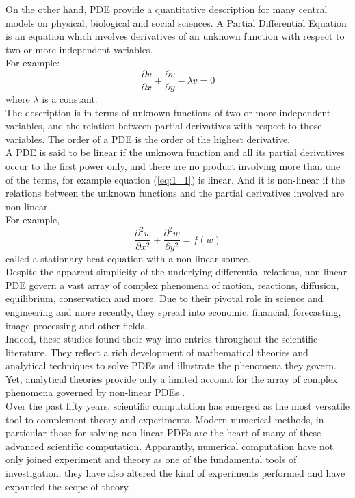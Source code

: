 \documentclass[11pt]{report}
\newcommand{\NI}{\noindent}
\newcommand{\sps}{\\[0.2cm]}
\newcommand{\refn}[1]{(\ref{#1})}
\newcommand{\refx}[1]{\refn{eq:#1}}
\newcommand{\PDe}{Partial Differential Equation }
\newcommand{\PDE}{PDE }
\newcommand{\PDEs}{PDEs }
\begin{document}
	\NI On the other hand, PDE provide a quantitative description for many central models on physical, biological and social sciences. A \PDe is an equation which involves derivatives of an unknown function with respect to two or more independent variables.\sps
	For example:
	\begin{equation}
		\frac{\partial v}{\partial x} + \frac{\partial v}{\partial y} - \lambda v = 0
		\label{eq:1_1}
	\end{equation}
	where $\lambda$ is a constant.\sps
	
	The description is in terms of unknown functions of two or more independent variables, and the relation between partial derivatives with respect to those variables. The order of a \PDE is the order of the highest derivative.\\
	
	A \PDE is said to be linear if the unknown function and all its partial derivatives occur to the first power only, and there are no product involving more than one of the terms, for example equation \refx{1_1} is linear. And it is non-linear if the relations between the unknown functions and the partial derivatives involved are non-linear.\sps
	For example,
	\begin{equation}
		\frac{\partial^2w}{\partial x^2}+\frac{\partial^2w}{\partial y^2} = f(w)
		\label{eq:1_2}
	\end{equation}
	called a stationary heat equation with a non-linear source.\sps
	
	Despite the apparent simplicity of the underlying differential relations, non-linear \PDE govern a vast array of complex phenomena of motion, reactions, diffusion, equilibrium, conservation and more. Due to their pivotal role in science and engineering and more recently, they spread into economic, financial, forecasting, image processing and other fields.\\
	
	Indeed, these studies found their way into entries throughout the scientific literature. They reflect a rich development of mathematical theories and analytical techniques to solve \PDEs  and illustrate the phenomena they govern. Yet, analytical theories provide only a limited account for the array of complex phenomena governed by non-linear \PDEs.\\
	
	Over the past fifty years, scientific computation has emerged as the most versatile tool to complement theory and experiments. Modern numerical methods, in particular those for solving non-linear \PDEs are the heart of many of these advanced scientific computation. Apparantly, numerical computation have not only joined experiment and theory as one of the fundamental tools of investigation, they have also altered the kind of experiments performed and have expanded the scope of theory.
	
\end{document}
